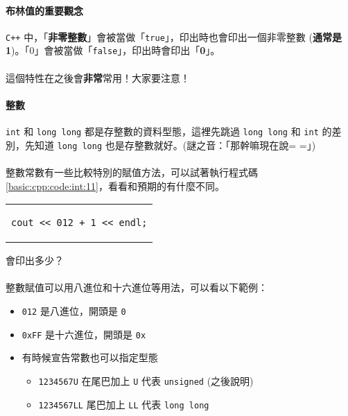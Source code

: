 \documentclass[12pt,a4paper,oneside]{report}
\begin{document}
\begin{CJK}{UTF8}{bkai}
\paragraph{布林值的重要觀念}\texttt{C++} 中，「\textbf{非零整數}」會被當做「\lstinline!true!」，印出時也會印出一個非零整數 (\textbf{通常是 1})。「0」會被當做「\lstinline!false!」，印出時會印出「\textbf{0}」。
\paragraph{}這個特性在之後會\textbf{非常}常用！大家要注意！

\paragraph{整數}\lstinline!int! 和 \lstinline!long long! 都是存整數的資料型態，這裡先跳過 \lstinline!long long! 和 \lstinline!int! 的差別，先知道 \lstinline!long long! 也是存整數就好。(謎之音：「那幹嘛現在說= =」)
\paragraph{}整數常數有一些比較特別的賦值方法，可以試著執行程式碼 \ref{basic:cpp:code:int:11}，看看和預期的有什麼不同。

\begin{code}[h!]
\centering
\begin{tabular}{c}
\begin{lstlisting}
cout << 012 + 1 << endl;
\end{lstlisting}
\end{tabular}
\caption{會印出多少？}
\label{basic:cpp:code:int:11}
\end{code}

\paragraph{}整數賦值可以用八進位和十六進位等用法，可以看以下範例：
\begin{itemize}
\item \lstinline!012! 是八進位，開頭是 \lstinline!0!
\item \lstinline!0xFF! 是十六進位，開頭是 \lstinline!0x!
\item 有時候宣告常數也可以指定型態
  \begin{itemize}
  \item \lstinline!1234567U! 在尾巴加上 \lstinline!U! 代表 \lstinline!unsigned! (之後說明)
  \item \lstinline!1234567LL! 尾巴加上 \lstinline!LL! 代表 \lstinline!long long!
  \end{itemize}
\end{itemize}


\end{CJK}
\end{document}
